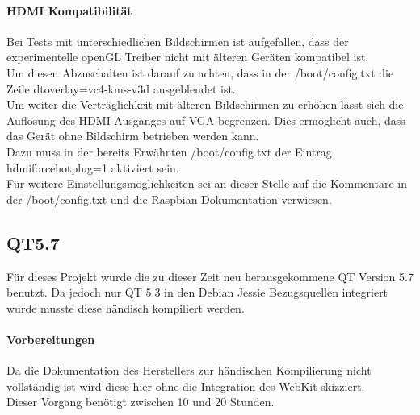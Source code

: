\paragraph{HDMI Kompatibilität}$\;$\\
Bei Tests mit unterschiedlichen Bildschirmen ist aufgefallen, dass der experimentelle openGL Treiber nicht mit älteren Geräten kompatibel ist.\\
Um diesen Abzuschalten ist darauf zu achten, dass in der /boot/config.txt die Zeile dtoverlay=vc4-kms-v3d ausgeblendet ist.\\
Um weiter die Verträglichkeit mit älteren Bildschirmen zu erhöhen lässt sich die Auflösung des HDMI-Ausganges auf VGA begrenzen. Dies ermöglicht auch, dass das Gerät ohne Bildschirm betrieben werden kann.\\
Dazu muss in der bereits Erwähnten /boot/config.txt der Eintrag hdmi\textunderscore force\textunderscore hotplug=1 aktiviert sein.\\
Für weitere Einstellungsmöglichkeiten sei an dieser Stelle auf die Kommentare in der /boot/config.txt und die Raspbian Dokumentation verwiesen.
\subsection{QT5.7}
Für dieses Projekt wurde die zu dieser Zeit neu herausgekommene QT Version 5.7 benutzt. Da jedoch nur QT 5.3 in den Debian Jessie Bezugsquellen integriert wurde musste diese händisch kompiliert werden.
\paragraph{Vorbereitungen}$\;$\\
Da die Dokumentation des Herstellers zur händischen Kompilierung nicht vollständig ist wird diese hier ohne die Integration des WebKit skizziert.\\
Dieser Vorgang benötigt zwischen 10 und 20 Stunden.

